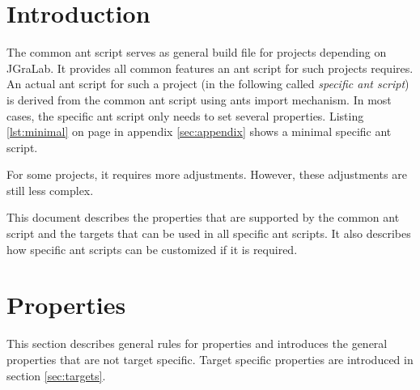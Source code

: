 \documentclass[a4paper,twoside,11pt,bibtotoc]{article}
\begin{document}
\sloppy

\begin{titlepage}



\end{titlepage}

\cleardoublepage

\tableofcontents

\cleardoublepage

\section{Introduction}
The common ant script serves as general build file for projects depending on JGraLab.
It provides all common features an ant script for such projects requires.
An actual ant script for such a project (in the following called \emph{specific ant script}) is derived from the common ant script using ants import mechanism.
In most cases, the specific ant script only needs to set several properties.
Listing \ref{lst:minimal} on page \pageref{lst:minimal} in appendix \ref{sec:appendix} shows a minimal specific ant script.

For some projects, it requires more adjustments.
However, these adjustments are still less complex.

This document describes the properties that are supported by the common ant script and the targets that can be used in all specific ant scripts.
It also describes how specific ant scripts can be customized if it is required.

\section{Properties}
\label{sec:properties}
This section describes general rules for properties and introduces the general properties that are not target specific.
Target specific properties are introduced in section \ref{sec:targets}.
\end{document}
